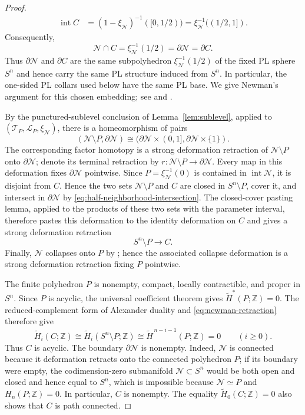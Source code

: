 \documentclass[12pt,oneside,a4paper]{article}
\theoremstyle{mytheorem}
\theoremstyle{remark}
\theoremstyle{definition}
\begin{document}
\begin{proof}
\[\begin{aligned}
 \operatorname{int}C
 &=(1-\xi_{\mathcal{N}})^{-1}([0,1/2))
   =\xi_{\mathcal{N}}^{-1}((1/2,1]).
\end{aligned}
\]
Consequently,
\begin{equation}\label{eq:half-neighborhood-intersection}
 \mathcal{N}\cap C
 =\xi_{\mathcal{N}}^{-1}(1/2)
 =\partial\mathcal{N}
 =\partial C.
\end{equation}
Thus $\partial\mathcal{N}$ and $\partial C$ are the same subpolyhedron
$\xi_{\mathcal{N}}^{-1}(1/2)$ of the fixed PL sphere $S^n$ and hence
carry the same PL structure induced from $S^n$.  In particular, the
one-sided PL collars used below have the same PL base.
We give Newman's argument for this chosen embedding; see
\cite[\S\S~2--3, pp.~193--195]{zbMATH03054974} and
\cite[Example~3.2.2]{zbMATH07206284}.

By the punctured-sublevel conclusion of Lemma~\ref{lem:sublevel},
applied to $(\mathcal{T}_P,\mathcal{L}_P,\xi_{\mathcal{N}})$, there is a
homeomorphism of pairs
\[
 (\mathcal{N}\setminus P,\partial\mathcal{N})
 \cong
 (\partial\mathcal{N}\times(0,1],
  \partial\mathcal{N}\times\{1\}).
\]
The corresponding factor homotopy is a strong deformation retraction
of $\mathcal{N}\setminus P$ onto $\partial\mathcal{N}$; denote its terminal
retraction by
$r:\mathcal{N}\setminus P\to\partial\mathcal{N}$.  Every map in this
deformation fixes $\partial\mathcal{N}$ pointwise.  Since
$P=\xi_{\mathcal{N}}^{-1}(0)$ is contained in
$\operatorname{int}\mathcal{N}$, it is disjoint from $C$.  Hence the
two sets $\mathcal{N}\setminus P$ and $C$ are closed in
$S^n\setminus P$, cover it, and intersect in $\partial\mathcal{N}$ by
\eqref{eq:half-neighborhood-intersection}.
The closed-cover pasting lemma, applied to the products of these two
sets with the parameter interval, therefore pastes this deformation to
the identity deformation on $C$ and gives a strong deformation
retraction
\begin{equation}\label{eq:newman-retraction}
 S^n\setminus P\longrightarrow C.
\end{equation}
Finally, $\mathcal{N}$ collapses onto $P$ by
\cite[Theorem~3.16]{zbMATH01714503}; hence the associated collapse
deformation is a strong deformation retraction fixing $P$ pointwise.

The finite polyhedron $P$ is nonempty, compact, locally contractible, and
proper in $S^n$.  Since $P$ is acyclic, the universal coefficient theorem
gives $\widetilde H^*(P;\mathbb Z)=0$.  The reduced-complement form of
Alexander duality \cite[Corollary~3.45]{zbMATH02103273} and
\eqref{eq:newman-retraction} therefore give
\[
 \widetilde H_i(C;\mathbb Z)
 \cong \widetilde H_i(S^n\setminus P;\mathbb Z)
 \cong \widetilde H^{\,n-i-1}(P;\mathbb Z)=0
 \qquad(i\geq0).
\]
Thus $C$ is acyclic.
The boundary $\partial\mathcal{N}$ is nonempty.  Indeed, $\mathcal{N}$
is connected because it deformation retracts onto the connected
polyhedron $P$; if its boundary were empty, the codimension-zero
submanifold $\mathcal{N}\subset S^n$ would be both open and
closed and hence equal to $S^n$, which is impossible because $\mathcal{N}\simeq P$
and $H_n(P;\mathbb Z)=0$.  In particular, $C$ is nonempty.  The equality
$\widetilde H_0(C;\mathbb Z)=0$ also shows that $C$ is path connected.


\end{proof}
\end{document}
